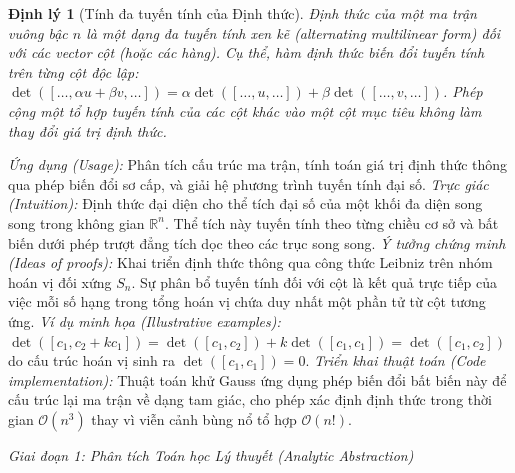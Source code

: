 \documentclass{article}
\newtheorem{dinhly}{Định lý}
\begin{document}
\begin{dinhly}[Tính đa tuyến tính của Định thức]
Định thức của một ma trận vuông bậc $n$ là một dạng đa tuyến tính xen kẽ (alternating multilinear form) đối với các vector cột (hoặc các hàng). Cụ thể, hàm định thức biến đổi tuyến tính trên từng cột độc lập: $\det([\ldots, \alpha u + \beta v, \ldots]) = \alpha \det([\ldots, u, \ldots]) + \beta \det([\ldots, v, \ldots])$. Phép cộng một tổ hợp tuyến tính của các cột khác vào một cột mục tiêu không làm thay đổi giá trị định thức.
\end{dinhly}
\emph{Ứng dụng (Usage):} Phân tích cấu trúc ma trận, tính toán giá trị định thức thông qua phép biến đổi sơ cấp, và giải hệ phương trình tuyến tính đại số.
\emph{Trực giác (Intuition):} Định thức đại diện cho thể tích đại số của một khối đa diện song song trong không gian $\mathbb{R}^n$. Thể tích này tuyến tính theo từng chiều cơ sở và bất biến dưới phép trượt đẳng tích dọc theo các trục song song.
\emph{Ý tưởng chứng minh (Ideas of proofs):} Khai triển định thức thông qua công thức Leibniz trên nhóm hoán vị đối xứng $S_n$. Sự phân bổ tuyến tính đối với cột là kết quả trực tiếp của việc mỗi số hạng trong tổng hoán vị chứa duy nhất một phần tử từ cột tương ứng.
\emph{Ví dụ minh họa (Illustrative examples):} $\det([c_1, c_2 + k c_1]) = \det([c_1, c_2]) + k\det([c_1, c_1]) = \det([c_1, c_2])$ do cấu trúc hoán vị sinh ra $\det([c_1, c_1]) = 0$.
\emph{Triển khai thuật toán (Code implementation):} Thuật toán khử Gauss ứng dụng phép biến đổi bất biến này để cấu trúc lại ma trận về dạng tam giác, cho phép xác định định thức trong thời gian $\mathcal{O}(n^3)$ thay vì viễn cảnh bùng nổ tổ hợp $\mathcal{O}(n!)$.

\vspace{0.5em}\noindent\emph{Giai đoạn 1: Phân tích Toán học Lý thuyết (Analytic Abstraction)}
\end{document}
